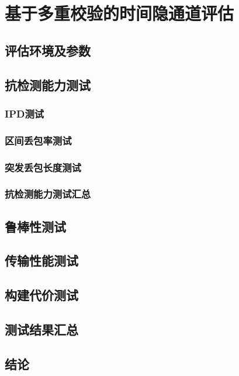 \section{基于多重校验的时间隐通道评估}
\label{chap:hash:result}

\subsection{评估环境及参数}
\label{chap:hash:result:parameters}

\subsection{抗检测能力测试}
\label{chap:hash:result:undetectability}

\subsubsection{IPD测试}
\label{chap:hash:result:undetectability:ipd}

\subsubsection{区间丢包率测试}
\label{chap:hash:result:undetectability:plr}

\subsubsection{突发丢包长度测试}
\label{chap:hash:result:undetectability:burst}

\subsubsection{抗检测能力测试汇总}
\label{chap:hash:result:undetectability:sum}

\subsection{鲁棒性测试}
\label{chap:hash:result:robustness}

\subsection{传输性能测试}
\label{chap:hash:result:throughput}

\subsection{构建代价测试}
\label{chap:hash:result:cost}

\subsection{测试结果汇总}
\label{chap:hash:result:evaluation}

\subsection{结论}
\label{chap:hash:result:conclusion}